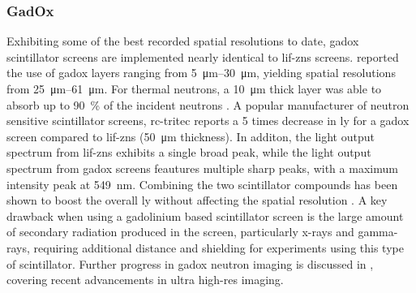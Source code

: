 \documentclass[../../../../main.tex]{subfiles}%
\begin{document}
%
    \subsubsection{GadOx}%
    \label{sec:chapter-2:scintillator-detectors:ceramics:gadox}%
    Exhibiting some of the best recorded spatial resolutions to date, \gls{gadox} scintillator screens are implemented nearly identical to \gls{lif-zns} screens.
    \citeauthor*{Toetzke_2011} reported the use of \gls{gadox} layers ranging from \SIrange{5}{30}{\micro\meter}, yielding spatial resolutions from \SIrange{25}{61}{\micro\meter}.
    For thermal neutrons, a \SI{10}{\micro\meter} thick layer was able to absorb up to \SI{90}{\percent} of the incident neutrons \cite{Toetzke_2011}.
    A popular manufacturer of neutron sensitive scintillator screens, \gls{rc-tritec} reports a \num{5} times decrease in \gls{ly} for a \gls{gadox} screen compared to \gls{lif-zns} (\SI{50}{\micro\meter} thickness).
    In additon, the light output spectrum from \gls{lif-zns} exhibits a single broad peak, while the light output spectrum from \gls{gadox} screens feautures multiple sharp peaks, with a maximum intensity peak at \SI{549}{\nano\meter}.
    Combining the two scintillator compounds has been shown to boost the overall \gls{ly} without affecting the spatial resolution \cite{website:RC-TRITEC}.
    A key drawback when using a gadolinium based scintillator screen is the large amount of secondary radiation produced in the screen, particularly \glspl{x-ray} and \glspl{gamma-ray}, requiring additional distance and shielding for experiments using this type of scintillator.
    Further progress in \gls{gadox} neutron imaging is discussed in , covering recent advancements in ultra \gls{high-res} imaging.
\end{document}
